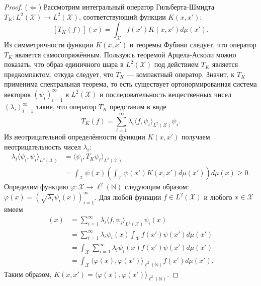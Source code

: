 \begin{proof}
    ($\Leftarrow$) Рассмотрим интегральный оператор Гильберта-Шмидта $T_K \colon L^2(\mathcal{X}) \to L^2(\mathcal{X})$, соответствующий функции $K(x, x')$:
    \[ [T_K(f)](x) = \int_\mathcal{X} f(x') K(x, x') d\mu(x'). \]
    Из симметричности функции $K(x, x')$ и теоремы Фубини следует, что оператор $T_K$ является самосопряжённым. Пользуясь теоремой Арцела-Асколи можно показать, что образ единичного шара в $L^2(\mathcal{X})$ под действием $T_K$ является предкомпактом, откуда следует, что $T_K$ --- компактный оператор. Значит, к $T_K$ применима спектральная теорема, то есть существует ортонормированная система векторов $(\psi_i)_{i=1} ^\infty$ в $L^2(\mathcal{X})$ и последовательность вещественных чисел $(\lambda_i)_{i=1}^\infty$ такие, что оператор $T_K$ представим в виде
    \[ T_K(f) = \sum_{i=1}^\infty \lambda_i \langle f, \psi_i \rangle_{L^2(\mathcal{X})} \psi_i. \]
    Из неотрицательной определённости функции $K(x, x')$ получаем неотрицательность чисел $\lambda_i$:
    \begin{align*}
        \lambda_i \langle \psi_i, \psi_i \rangle_{L^2(\mathcal{X})} & = \langle \psi_i, T_K \psi_i \rangle_{L^2(\mathcal{X})}                                              \\
                                                                    & = \int_\mathcal{X} \psi(x) \left( \int_\mathcal{X} \psi(x') K(x, x') d\mu(x') \right) d\mu(x) \ge 0.
    \end{align*}
    Определим функцию $\varphi \colon \mathcal{X} \to \ell^2(\mathbb{N})$ следующим образом: $\varphi(x) = (\sqrt{\lambda_i} \psi_i(x))_{i=1}^\infty$. Для любой функции $f \in L^2(\mathcal{X})$ и любого $x \in \mathcal{X}$ имеем
    \begin{align*}
        [T_K(f)](x) & = \sum_{i=1}^\infty \lambda_i \langle f, \psi_i \rangle_{L^2(\mathcal{X})} \psi_i(x)            \\
                    & = \sum_{i=1}^\infty \lambda_i \psi_i(x) \int_\mathcal{X} f(x') \psi(x') d\mu(x')                \\
                    & = \int_\mathcal{X} \sum_{i=1}^\infty \lambda_i \psi_i(x) f(x') \psi(x') d\mu(x')                \\
                    & = \int_\mathcal{X} \langle \varphi(x), \varphi(x') \rangle_{\ell^2(\mathbb{N})} f(x') d\mu(x').
    \end{align*}
    Таким образом, $K(x, x') = \langle \varphi(x), \varphi(x') \rangle_{\ell^2(\mathbb{N})}$.
\end{proof}

